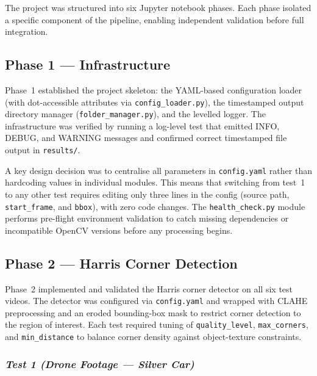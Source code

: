 \documentclass[12pt,a4paper]{article}
\begin{document}
The project was structured into six Jupyter notebook phases. Each phase isolated a specific
component of the pipeline, enabling independent validation before full integration.

\subsection{Phase 1 --- Infrastructure}

Phase~1 established the project skeleton: the YAML-based configuration loader (with
dot-accessible attributes via \texttt{config\_loader.py}), the timestamped output directory
manager (\texttt{folder\_manager.py}), and the levelled logger. The infrastructure was verified
by running a log-level test that emitted INFO, DEBUG, and WARNING messages and confirmed correct
timestamped file output in \texttt{results/}.

A key design decision was to centralise all parameters in \texttt{config.yaml} rather than
hardcoding values in individual modules. This means that switching from test~1 to any other test
requires editing only three lines in the config (source path, \texttt{start\_frame}, and
\texttt{bbox}), with zero code changes. The \texttt{health\_check.py} module performs pre-flight
environment validation to catch missing dependencies or incompatible OpenCV versions before any
processing begins.

\subsection{Phase 2 --- Harris Corner Detection}

Phase~2 implemented and validated the Harris corner detector on all six test videos. The detector
was configured via \texttt{config.yaml} and wrapped with CLAHE preprocessing and an eroded
bounding-box mask to restrict corner detection to the region of interest. Each test required
tuning of \texttt{quality\_level}, \texttt{max\_corners}, and \texttt{min\_distance} to balance
corner density against object-texture constraints.

\subsubsection*{\textit{Test 1 (Drone Footage --- Silver Car)}}
\end{document}
